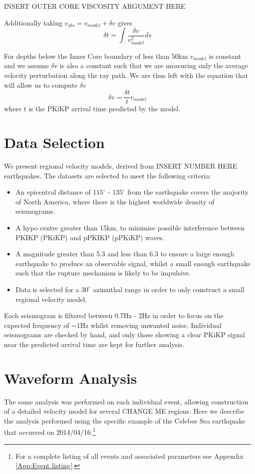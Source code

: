 \documentclass[11pt,a4paper]{article}
\begin{document}
INSERT OUTER CORE VISCOSITY ARGUMENT HERE

Additionally taking $v_{obs} = v_{model} + \delta v$ gives
\begin{equation}
	\delta t = \int \frac{\delta v}{v^{2}_{model}} ds
\end{equation}

For depths below the Inner Core boundary of less than 50km $v_{model}$ is constant and we assume $\delta v$ is also a constant such that we are measuring only the average velocity perturbation along the ray path. We are thus left with the equation that will allow us to compute $\delta v$
\begin{equation}
	\delta v = \frac{\delta t}{t} v_{model}
\end{equation}
where $t$ is the PKiKP arrival time predicted by the model.
\section{Data Selection}

We present regional velocity models, derived from INSERT NUMBER HERE earthquakes. The datasets are selected to meet the following criteria:

\begin{itemize}
	\item An epicentral distance of $115^{\circ}$ - $135^{\circ}$ from the earthquake covers the majority of North America, where there is the highest worldwide density of seismograms.
	\item A hypo centre greater than 15km, to minimise possible interference between PKIKP (PKiKP) and pPKIKP (pPKiKP) waves.
	\item A magnitude greater than 5.3 and less than 6.3 to ensure a large enough earthquake to produce an observable signal, whilst a small enough earthquake such that the rupture mechanism is likely to be impulsive.
	\item Data is selected for a $30^{\circ}$ azimuthal range in order to only construct a small regional velocity model.
\end{itemize}

Each seismogram is filtered between 0.7Hz - 2Hz in order to focus on the expected frequency of $\sim$1Hz whilst removing unwanted noise. Individual seismograms are checked by hand, and only those showing a clear PKiKP signal near the predicted arrival time are kept for further analysis.

\section{Waveform Analysis}
\label{sec:Waveforms}
The same analysis was performed on each individual event, allowing construction of a detailed velocity model for several CHANGE ME regions. Here we describe the analysis performed using the specific example of the Celebes Sea earthquake that occurred on 2014/04/16.\footnote{For a complete listing of all events and associated parameters see Appendix \ref{App:Event listing}.}
\end{document}
